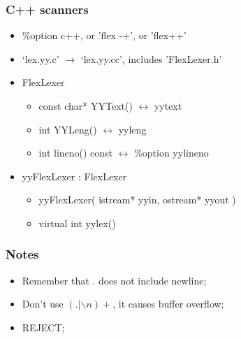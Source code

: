 \documentclass[14pt]{beamer}
\begin{document}
\begin{frame}[fragile]
	
	\frametitle{C++ scanners}
	
	\begin{itemize}
		\item \%option c++, or 'flex -+', or 'flex++'
		\item `lex.yy.c' $\rightarrow$ `lex.yy.cc', includes 'FlexLexer.h'
		\item FlexLexer \begin{itemize}
			\item const char* YYText() $\leftrightarrow$ yytext
			\item int YYLeng() $\leftrightarrow$ yyleng
			\item int lineno() const $\leftrightarrow$ \%option yylineno
		\end{itemize}
		\item yyFlexLexer : FlexLexer \begin{itemize}
			\item yyFlexLexer( istream* yyin, ostream* yyout )
			\item virtual int yylex()
		\end{itemize}
	\end{itemize}
	
\end{frame}

\begin{frame}[fragile]
	
	\frametitle{Notes}	
	
	\begin{itemize}
		\item Remember that . does not include newline;
		\item Don't use $(.|\backslash n)+$, it causes buffer overflow;
		\item REJECT; 
	\end{itemize}
	
\end{frame}

	
	\begin{frame}
	\end{frame}
	
\end{document}
